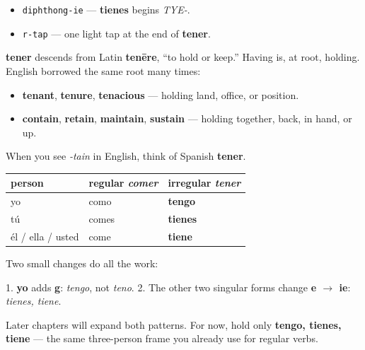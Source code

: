 \begin{sounds}
\begin{itemize}
\raggedright
  \item \texttt{diphthong-ie} — \textbf{tienes} begins \emph{TYE-}.
  \item \texttt{r-tap} — one light tap at the end of \textbf{tener}.
\end{itemize}
\end{sounds}

\begin{cousinweb}
\textbf{tener} descends from Latin \textbf{tenēre}, “to hold or keep.” Having is, at root, holding. English borrowed the same root many times:

\begin{itemize}
\raggedright
  \item \textbf{tenant}, \textbf{tenure}, \textbf{tenacious} — holding land, office, or position.
  \item \textbf{contain}, \textbf{retain}, \textbf{maintain}, \textbf{sustain} — holding together, back, in hand, or up.
\end{itemize}

When you see \emph{-tain} in English, think of Spanish \textbf{tener}.
\end{cousinweb}

\begin{grammarlens}[title={Grammar Lens: the three singular forms}]
\noindent
\begin{tabularx}{\linewidth}{@{}>{\raggedright\arraybackslash}X>{\raggedright\arraybackslash}X>{\raggedright\arraybackslash}X@{}}
\toprule
\textbf{person} & \textbf{regular \emph{comer}} & \textbf{irregular \emph{tener}} \\
\midrule
yo & como & \textbf{tengo} \\
tú & comes & \textbf{tienes} \\
él / ella / usted & come & \textbf{tiene} \\
\bottomrule
\end{tabularx}

Two small changes do all the work:

1. \textbf{yo} adds \textbf{g}: \emph{tengo}, not \emph{teno}. 2. The other two singular forms change \textbf{e $\to$ ie}: \emph{tienes, tiene}.

Later chapters will expand both patterns. For now, hold only \textbf{tengo, tienes, tiene} — the same three-person frame you already use for regular verbs.
\end{grammarlens}

